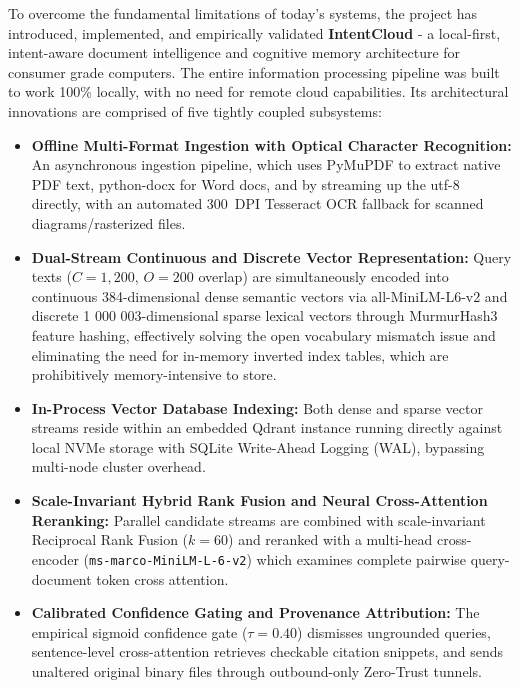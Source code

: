 \documentclass[a4paper,12pt]{article}
\begin{document}
To overcome the fundamental limitations of today's systems, the project has introduced, implemented, and empirically validated \textbf{IntentCloud} - a local-first, intent-aware document intelligence and cognitive memory architecture for consumer grade computers. The entire information processing pipeline was built to work 100\% locally, with no need for remote cloud capabilities. Its architectural innovations are comprised of five tightly coupled subsystems:
\begin{itemize}
    \setlength{\itemsep}{1.5pt}
    \setlength{\parskip}{0pt}
    \item \textbf{Offline Multi-Format Ingestion with Optical Character Recognition:} An asynchronous ingestion pipeline, which uses PyMuPDF to extract native PDF text, python-docx for Word docs, and by streaming up the utf-8 directly, with an automated 300~DPI Tesseract OCR fallback for scanned diagrams/rasterized files.
    \item \textbf{Dual-Stream Continuous and Discrete Vector Representation:} Query texts ($C = 1,200$, $O = 200$ overlap) are simultaneously encoded into continuous 384-dimensional dense semantic vectors via all-MiniLM-L6-v2 and discrete 1 000 003-dimensional sparse lexical vectors through MurmurHash3 feature hashing, effectively solving the open vocabulary mismatch issue and eliminating the need for in-memory inverted index tables, which are prohibitively memory-intensive to store.
    \item \textbf{In-Process Vector Database Indexing:} Both dense and sparse vector streams reside within an embedded Qdrant instance running directly against local NVMe storage with SQLite Write-Ahead Logging (WAL), bypassing multi-node cluster overhead.
    \item \textbf{Scale-Invariant Hybrid Rank Fusion and Neural Cross-Attention Reranking:} Parallel candidate streams are combined with scale-invariant Reciprocal Rank Fusion ($k=60$) and reranked with a multi-head cross-encoder (\texttt{ms-marco-MiniLM-L-6-v2}) which examines complete pairwise query-document token cross attention.
    \item \textbf{Calibrated Confidence Gating and Provenance Attribution:} The empirical sigmoid confidence gate ($\tau = 0. 40$) dismisses ungrounded queries, sentence-level cross-attention retrieves checkable citation snippets, and sends unaltered original binary files through outbound-only Zero-Trust tunnels.
\end{itemize}
\end{document}
